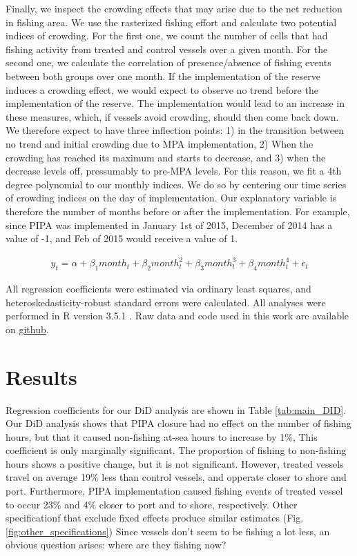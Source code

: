 \documentclass[9pttwoside,lineno]{pnas-new}
\begin{document}
Finally, we inspect the crowding effects that may arise due to the net reduction
in fishing area. We use the rasterized fishing effort and calculate two
potential indices of crowding. For the first one, we count the number of cells
that had fishing activity from treated and control vessels over a given month. For the second one,
we calculate the correlation of presence/absence of fishing events between both groups
over one month. If the implementation of the reserve induces a crowding effect,
we would expect to observe no trend before the implementation of the reserve.
The implementation would lead to an increase in these measures, which, 
if vessels avoid crowding, should then come back down. We therefore expect to
have three inflection points: 1) in the transition between no trend and initial crowding due to MPA
implementation, 2) When the crowding has reached its maximum and starts to decrease,
and 3) when the decrease levels off, pressumably to pre-MPA levels.
For this reason, we fit a 4th degree polynomial to our monthly indices. We do so by
centering our time series of crowding indices on the day of implementation. Our
explanatory variable is therefore the number of months before or after the implementation.
For example, since PIPA was implemented in January 1st of 2015, December of 2014 
has a value of -1, and Feb of 2015 would receive a value of 1.

\begin{figure}[h]
\begin{align*}
y_t = \alpha + \beta_1 month_t + \beta_2 month_t^2 + \beta_3 month_t^3 + \beta_4 month_t ^4 + \epsilon_t
\end{align*}
\end{figure}

All regression coefficients were estimated via ordinary least squares,
and heteroskedasticity-robust standard errors were calculated. All analyses
were performed in R version 3.5.1 \citep{rcore_2018}. Raw data and code
used in this work are available on
\href{https://github.com/jcvdav/MPA_displacement}{github}.

\section{Results}\label{results}

Regression coefficients for our DiD analysis are shown in Table
\ref{tab:main_DID}. Our DiD analysis shows that PIPA closure
had no effect on the number of fishing hours, but that it caused
non-fishing at-sea hours to increase by 1\%, This coefficient is
only marginally significant. The proportion of
fishing to non-fishing hours shows a positive change, but it is not
significant. However, treated vessels travel on average 19\% less
than control vessels, and opperate closer to shore and port.
Furthermore, PIPA implementation caused fishing events of treated
vessel to occur 23\% and 4\% closer to port and to shore, respectively.
Other specificationf that exclude fixed effects produce similar estimates (Fig. \ref{fig:other_specifications})
Since vessels don't seem to be fishing a lot less, an obvious question arises: where are they
fishing now?
\end{document}
